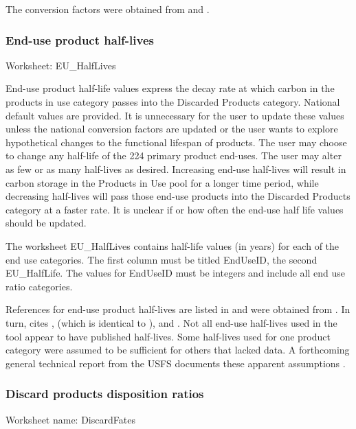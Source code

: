 \documentclass[
  openany]{book}
\begin{document}
The conversion factors were obtained from \textcite{smith2006} and \textcite{skog2008}.

\hypertarget{own-prov-input-euhl}{%
\subsubsection{End-use product half-lives}\label{own-prov-input-euhl}}

Worksheet: EU\_HalfLives

End-use product half-life values express the decay rate at which carbon in the products in use category passes into the Discarded Products category. National default values are provided. It is unnecessary for the user to update these values unless the national conversion factors are updated or the user wants to explore hypothetical changes to the functional lifespan of products. The user may choose to change any half-life of the 224 primary product end-uses. The user may alter as few or as many half-lives as desired. Increasing end-use half-lives will result in carbon storage in the Products in Use pool for a longer time period, while decreasing half-lives will pass those end-use products into the Discarded Products category at a faster rate. It is unclear if or how often the end-use half life values should be updated.

The worksheet EU\_HalfLives contains half-life values (in years) for each of the end use categories. The first column must be titled EndUseID, the second EU\_HalfLife. The values for EndUseID must be integers and include all end use ratio categories.

References for end-use product half-lives are listed in and were obtained from \textcite{smith2006}. In turn, \textcite{smith2006} cites \textcite{skog1998}, \textcite{skog2000} (which is identical to \textcite{skog1998}), and \textcite{row1996}. Not all end-use half-lives used in the tool appear to have published half-lives. Some half-lives used for one product category were assumed to be sufficient for others that lacked data. A forthcoming general technical report from the USFS documents these apparent assumptions \autocite{lucey202X}.

\hypertarget{own-prov-input-discFates}{%
\subsubsection{Discard products disposition ratios}\label{own-prov-input-discFates}}

Worksheet name: DiscardFates
\end{document}

